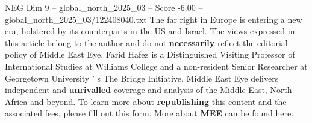 \begin{textsample}{NEG Dim 9 – global\_north\_2025\_03 – Score -6.00 – global\_north\_2025\_03/122408040.txt}
The far right in Europe is entering a new era, bolstered by its counterparts in the US and Israel.
The views expressed in this article belong to the author and do not \textbf{necessarily} reflect the editorial policy of Middle East Eye.
Farid Hafez is a Distinguished Visiting Professor of International Studies at Williams College and a non-resident Senior Researcher at Georgetown University ' s The Bridge Initiative.
Middle East Eye delivers independent and \textbf{unrivalled} coverage and analysis of the Middle East, North Africa and beyond.
To learn more about \textbf{republishing} this content and the associated fees, please fill out this form.
More about \textbf{MEE} can be found here.

\end{textsample}
